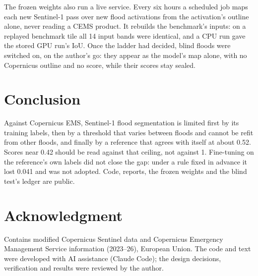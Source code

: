 \documentclass[conference]{IEEEtran}
\begin{document}
The frozen weights also run a live service. Every six hours a scheduled job maps each new Sentinel-1 pass over
new flood activations from the activation's outline alone, never reading a CEMS product. It rebuilds the
benchmark's inputs: on a replayed benchmark tile all 14 input bands were identical, and a CPU run gave the stored
GPU run's IoU. Once the ladder had decided, blind floods were switched on, on the author's go: they appear as the
model's map alone, with no Copernicus outline and no score, while their scores stay sealed.

\section{Conclusion}
Against Copernicus EMS, Sentinel-1 flood segmentation is limited first by its training labels, then by a threshold
that varies between floods and cannot be refit from other floods, and finally by a reference that agrees with
itself at about 0.52. Scores near 0.42 should be read against that ceiling, not against 1. Fine-tuning on the
reference's own labels did not close the gap: under a rule fixed in advance it lost 0.041 and was not adopted.
Code, reports, the frozen weights and the blind test's ledger are public.

\section*{Acknowledgment}
Contains modified Copernicus Sentinel data and Copernicus Emergency Management Service information (2023--26),
\textcopyright{} European Union. The code and text were developed with AI assistance (Claude Code); the design
decisions, verification and results were reviewed by the author.



\end{document}
